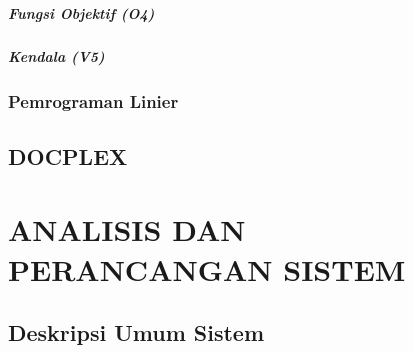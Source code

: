 \documentclass[ugmskripsi]{ugmskripsi}
\begin{document}
			\paragraph{Fungsi Objektif (O4)}
			\label{o4}	
			
			
			\paragraph{Kendala (V5)}
			\label{v5}	
			

		\subsection{Pemrograman Linier}
		\label{MILP}
		
	
	\section{DOCPLEX}
	\label{docplex}
	





\chapter{ANALISIS DAN PERANCANGAN SISTEM}
\label{ANALISIS DAN PERANCANGAN SISTEM}

	\section{Deskripsi Umum Sistem}
	\label{rancangan deskripsi umum sistem}
	
\end{document}
